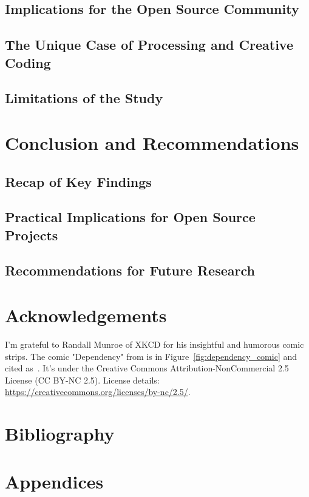 \documentclass{article}
\newcommand{\getyear}[1]{\citeyear{#1}}
\begin{document}
\subsection{Implications for the Open Source Community}
\subsection{The Unique Case of Processing and Creative Coding}
\subsection{Limitations of the Study}

\section{Conclusion and Recommendations}

\subsection{Recap of Key Findings}
\subsection{Practical Implications for Open Source Projects}
\subsection{Recommendations for Future Research}

\section{Acknowledgements}
I'm grateful to Randall Munroe of XKCD for his insightful and humorous comic strips. The comic "Dependency" from \getyear{munroeDependency2020} is in Figure~\ref{fig:dependency_comic} and cited as~\cite{munroeDependency2020}. It's under the Creative Commons Attribution-NonCommercial 2.5 License (CC BY-NC 2.5). License details: \url{https://creativecommons.org/licenses/by-nc/2.5/}.

\section{Bibliography}
\printbibliography

\section{Appendices}
\end{document}
